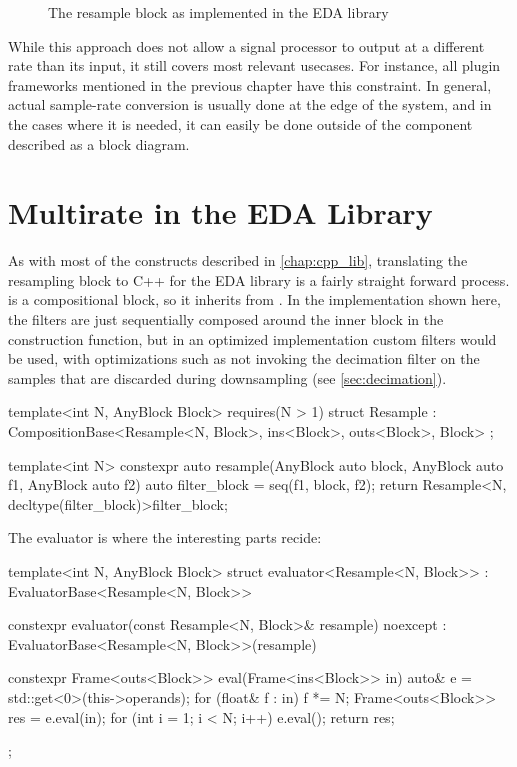 \begin{figure}
  \centering
  
  \caption{The resample block as implemented in the EDA library}
  \label{fig:block_resample}
\end{figure}

While this approach does not allow a signal processor to output at a different rate than its input, it still
covers most relevant usecases. For instance, all plugin frameworks mentioned in the previous chapter have
this constraint. In general, actual sample-rate conversion is usually done at the edge of the system, and in
the cases where it is needed, it can easily be done outside of the component described as a block diagram.

\section{Multirate in the EDA Library}
\label{sec:multirate_eda}

As with most of the constructs described in \autoref{chap:cpp_lib}, translating the resampling block to C++
for the EDA library is a fairly straight forward process. \Resample is a compositional block, so it inherits
from . In the implementation shown here, the filters are just sequentially composed
around the inner block in the construction function, but in an optimized implementation custom filters would
be used, with optimizations such as not invoking the decimation filter on the samples that are discarded
during downsampling (see \autoref{sec:decimation}).

\begin{cppcodenl}
  template<int N, AnyBlock Block>
  requires(N > 1)
  struct Resample : CompositionBase<Resample<N, Block>, ins<Block>, outs<Block>, Block> {};

  template<int N>
  constexpr auto resample(AnyBlock auto block, AnyBlock auto f1, AnyBlock auto f2)
  {
    auto filter_block = seq(f1, block, f2);
    return Resample<N, decltype(filter_block)>{{filter_block}};
  }
\end{cppcodenl}

The evaluator is where the interesting parts recide:

\newpage
\begin{cppcode}
  template<int N, AnyBlock Block>
  struct evaluator<Resample<N, Block>> : EvaluatorBase<Resample<N, Block>> {
    constexpr evaluator(const Resample<N, Block>& resample) noexcept
    : EvaluatorBase<Resample<N, Block>>(resample)
    {}

    constexpr Frame<outs<Block>> eval(Frame<ins<Block>> in)
    {
      auto& e = std::get<0>(this->operands);
      for (float& f : in) {
        f *= N;
      }
      Frame<outs<Block>> res = e.eval(in);
      for (int i = 1; i < N; i++) {
        e.eval({});
      }
      return res; 
    }
  };
\end{cppcode}


